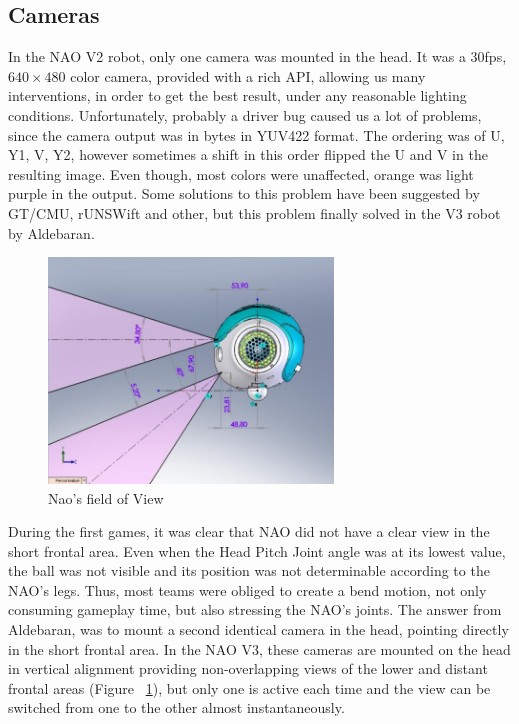 \subsection{Cameras}

In the NAO V2 robot, only one camera was mounted in the head. It was a 30fps, $640 \times 480$ color camera, provided with a rich API, allowing us many interventions, in order to get the best result, under any reasonable lighting conditions. Unfortunately, probably a driver bug caused us a lot of problems, since the camera output was in bytes in YUV422 format. The ordering was of U, Y1, V, Y2, however sometimes a shift in this order flipped the U and V in the resulting image. Even though, most colors were unaffected, orange was light purple in the output. Some solutions to this problem have been suggested by GT/CMU, rUNSWift and other, but this problem finally solved in the V3 robot by Aldebaran.

\begin{figure}
	\begin{center}
		\includegraphics[height=6cm]{Chapter1/figures/fieldOfView.jpg}
		\caption{Nao's field of View}
		\label{fig:fieldOfView}
	\end{center}
\end{figure}

During the first games, it was clear that NAO did not have a clear view in the short frontal area. Even when the Head Pitch Joint angle was at its lowest value, the ball was not visible and its position was not determinable according to the NAO's legs. Thus, most teams were obliged to create a bend motion, not only consuming gameplay time, but also stressing the NAO's joints. The answer from Aldebaran, was to mount a second identical camera in the head, pointing directly in the short frontal area. In the NAO V3, these cameras are mounted on the head in vertical alignment providing non-overlapping views of the lower and distant frontal areas (Figure ~\ref{fig:fieldOfView}), but only one is active each time and the view can be switched from one to the other almost instantaneously.


